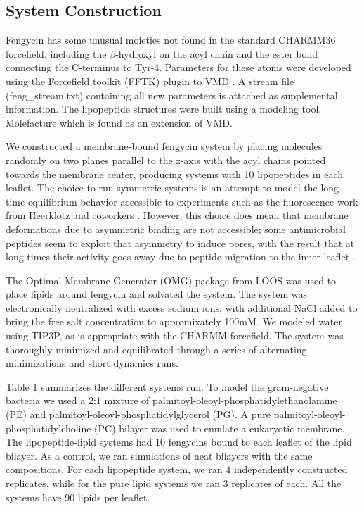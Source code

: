 \subsection{System Construction} 
\label{ss:ch2_sys_constr} 
Fengycin has some unusual
moieties not found in the standard CHARMM36 forcefield, including the $\beta \mbox{-}$hydroxyl
on the acyl chain and the ester bond connecting the C-terminus to
Tyr-4. Parameters for these atoms were developed using the Forcefield
toolkit (FFTK) plugin to VMD \cite{Gumbart2013,Schulten1996}. A stream file (feng\_stream.txt)
containing all new parameters is attached as supplemental information.
The lipopeptide structures were built using a modeling tool, Molefacture
 which is found as an extension of VMD.\cite{Schulten1996}

We constructed a membrane-bound fengycin system by placing molecules randomly on
two planes parallel to the z-axis with the acyl chains pointed towards the
membrane center, producing systems with 10 lipopeptides in each leaflet. The
choice to run symmetric systems is an attempt to model the long-time equilibrium
behavior accessible to experiments such as the fluorescence work from Heerklotz
and coworkers \cite{Heerklotz2011}. However, this choice does mean that membrane
deformations due to asymmetric binding are not accessible; some antimicrobial
peptides seem to exploit that asymmetry to induce pores, with the result that at
long times their activity goes away due to peptide migration to the inner
leaflet \cite{Wimley2012}.

The Optimal Membrane Generator (OMG) package from LOOS was used to place lipids
around fengycin and solvated the system.\cite{Grossfield2009,Grossfield2015} The
system was electronically neutralized with excess sodium ions, with additional
NaCl added to bring the free salt concentration to appromixately 100mM. We
modeled water using TIP3P, as is appropriate with the CHARMM forcefield. The
system was thoroughly minimized and equilibrated through a series of alternating
minimizations and short dynamics runs.

Table 1 summarizes the different systems run. To model the gram-negative
bacteria we used a 2:1 mixture of palmitoyl-oleoyl-phosphatidylethanolamine (PE)
and palmitoyl-oleoyl-phosphatidylglycerol (PG). A pure palmitoyl-oleoyl-phosphatidylcholine
(PC) bilayer was used to emulate a eukaryotic membrane. The
lipopeptide-lipid systems had 10 fengycins bound to each leaflet of the lipid
bilayer. As a control, we ran simulations of neat bilayers with the same
compositions. For each lipopeptide system, we ran 4 independently constructed
replicates, while for the pure lipid systems we ran 3 replicates of each. All
the systems have 90 lipids per leaflet.

